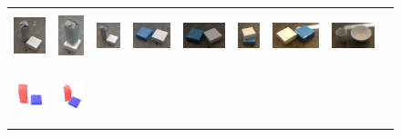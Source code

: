 \begin{figure}[h!]
\begin{tabular}{ccccccccc}
    \includegraphics[height=1.5cm]{pictures/22.jpg}&
    \includegraphics[height=1.5cm]{pictures/32.jpg}&
    \includegraphics[height=1.5cm]{pictures/42.jpg}&
    \includegraphics[height=1.5cm]{pictures/52.jpg}&
    \includegraphics[height=1.5cm]{pictures/62.jpg}&
    \includegraphics[height=1.5cm]{pictures/72.jpg}&
    \includegraphics[height=1.5cm]{pictures/82.jpg}&
    \includegraphics[height=1.5cm]{pictures/92.jpg}\\ \includegraphics[height=1.5cm]{pictures/13.png}&
    \includegraphics[height=1.5cm]{pictures/23.png}&

\end{tabular}
\end{figure}

